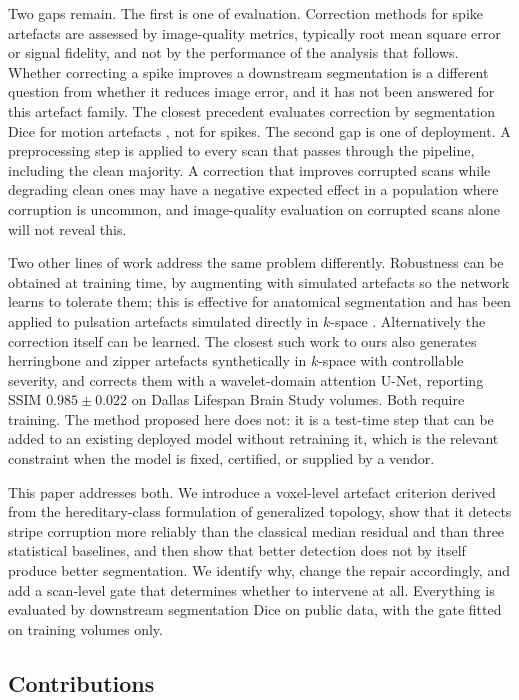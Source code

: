 \documentclass[12pt]{article}
\theoremstyle{definition}
\theoremstyle{plain}
\begin{document}
Two gaps remain. The first is one of evaluation. Correction methods for spike
artefacts are assessed by image-quality metrics, typically root mean square error or
signal fidelity, and not by the performance of the analysis that follows. Whether
correcting a spike improves a downstream segmentation is a different question from
whether it reduces image error, and it has not been answered for this artefact
family. The closest precedent evaluates correction by segmentation Dice for motion
artefacts \cite{oksuz2019}, not for spikes. The second gap is one of deployment. A
preprocessing step is applied to every scan that passes through the pipeline,
including the clean majority. A correction that improves corrupted scans while
degrading clean ones may have a negative expected effect in a population where
corruption is uncommon, and image-quality evaluation on corrupted scans alone will
not reveal this.

Two other lines of work address the same problem differently. Robustness can be
obtained at training time, by augmenting with simulated artefacts so the network
learns to tolerate them; this is effective for anatomical segmentation
\cite{boone2023rood} and has been applied to pulsation artefacts simulated directly
in $k$-space \cite{tamada2025}. Alternatively the correction itself can be learned. The closest such work to ours
\cite{rios2026} also generates herringbone and zipper artefacts synthetically in
$k$-space with controllable severity, and corrects them with a wavelet-domain
attention U-Net, reporting SSIM $0.985 \pm 0.022$ on Dallas Lifespan Brain Study
volumes. Both require training. The method proposed here does not: it is a
test-time step that can be added to an existing deployed model without retraining
it, which is the relevant constraint when the model is fixed, certified, or supplied
by a vendor.

This paper addresses both. We introduce a voxel-level artefact criterion derived
from the hereditary-class formulation of generalized topology, show that it detects
stripe corruption more reliably than the classical median residual and than three
statistical baselines, and then show that better detection does not by itself
produce better segmentation. We identify why, change the repair accordingly, and add
a scan-level gate that determines whether to intervene at all. Everything is
evaluated by downstream segmentation Dice on public data, with the gate fitted on
training volumes only.

\subsection{Contributions}
\end{document}
